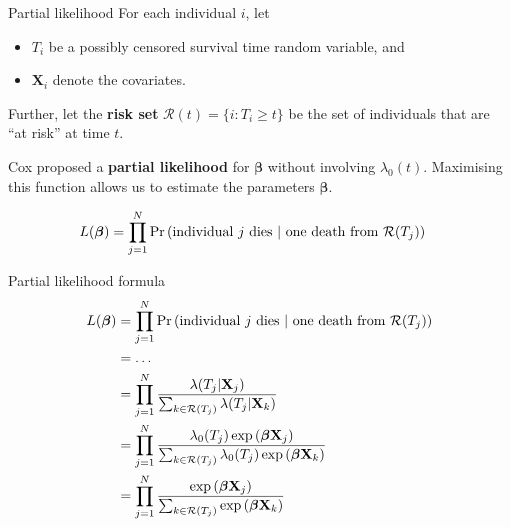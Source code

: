 
\begin{frame}{Partial likelihood}
    For each individual $i$, let
    \begin{itemize}
        \item $T_i$ be a possibly censored survival time random variable, and
        \item $\mathbf{X}_i$ denote the covariates.
    \end{itemize}
    Further, let the \textbf{risk set} $\mathcal{R}(t)=\{i : T_i \geq t\}$ be the set of individuals that are ``at risk'' at time $t$.

    \pause
    Cox proposed a \textbf{partial likelihood} for $\boldsymbol{\beta}$ without involving $\lambda_0(t)$. 
    Maximising this function allows us to estimate the parameters $\boldsymbol{\beta}$.

    \pause
    \begin{align*}
        L(\boldsymbol{\beta})
            &= \prod_{j=1}^N \prob{\text{individual $j$ dies} \ | \ \text{one death from $\mathcal{R}(T_j)$}}    \end{align*}
\end{frame}
\begin{frame}{Partial likelihood formula}
    \begin{align*}
        L(\boldsymbol{\beta})
            &= \prod_{j=1}^N \prob{\text{individual $j$ dies} \ | \ \text{one death from $\mathcal{R}(T_j)$}} \\
            &= \dots \\
            &= \prod_{j=1}^N \frac
                {\lambda(T_j | \mathbf{X}_j)}
                {\sum_{k \in \mathcal{R}(T_j)} \lambda(T_j | \mathbf{X}_k)} \\
            &= \prod_{j=1}^N \frac
                {\lambda_0(T_j) \exp\left(\boldsymbol\beta \mathbf{X}_j\right)}
                {\sum_{k \in \mathcal{R}(T_j)} \lambda_0(T_j) \exp\left(\boldsymbol\beta \mathbf{X}_k\right)} \\
            &= \prod_{j=1}^N \frac
                {\exp\left(\boldsymbol\beta \mathbf{X}_j\right)}
                {\sum_{k \in \mathcal{R}(T_j)} \exp\left(\boldsymbol\beta \mathbf{X}_k\right)}
    \end{align*}
\end{frame}
